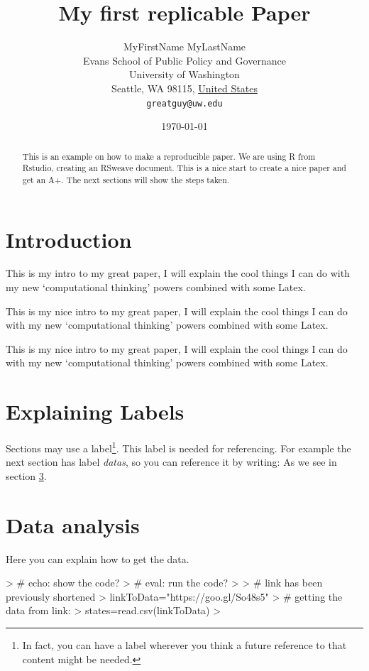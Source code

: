 \documentclass[11pt]{article}
\title{My first replicable Paper}
\author{
        MyFirstName MyLastName\\
        Evans School of Public Policy and Governance\\
        University of Washington\\
        Seattle, WA 98115, \underline{United States}\\
        \texttt{greatguy@uw.edu}
}
\date{\today}
\begin{document}


\maketitle


\begin{abstract}
This is an example on how to make a reproducible paper. We are using R from Rstudio, creating an RSweave document. This is a nice start to create a nice paper and get an A+. The next sections will show the steps taken.
\end{abstract}

\section{Introduction}\label{intro}
This is my intro to my great paper, I will explain the cool things I can do with my new `computational thinking' powers combined with some Latex.

This is my nice intro to my great paper, 
I will explain the cool things I can do with my new `computational thinking' powers combined with some Latex.



This is my nice intro to my great paper, 
I will explain the cool things 
I can do with my new `computational thinking' 
powers
combined with some Latex.

\section{Explaining Labels}\label{outline}

Sections may use a label\footnote{In fact, you can have a label wherever you think a future reference to that content might be needed.}. This label is needed for referencing. For example the next section has label \emph{datas}, so you can reference it by writing: As we see in section \ref{datas}.

\section{Data analysis}\label{datas}

Here you can explain how to get the data.%

\begin{Schunk}
\begin{Sinput}
> # echo: show the code?
> # eval: run the code?
> 
> # link has been previously shortened
> linkToData="https://goo.gl/So48s5"
> # getting the data from link:
> states=read.csv(linkToData)
> 
\end{Sinput}
\end{Schunk}
\end{document}
